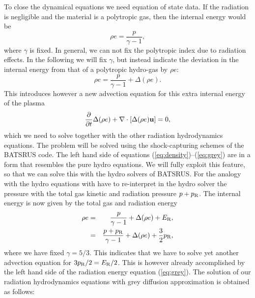 \documentclass[12pt]{article}
\newcommand{\Erad}{E_{\rm R}}
\newcommand{\prad}{p_{\rm R}}
\begin{document}
To close the dynamical equations we need equation of state data. 
If the radiation is negligible and the material is a polytropic gas, 
then the internal energy would be 
\begin{equation} 
\rho e = \frac{p}{\gamma - 1}, 
\end{equation} 
where $\gamma$ is fixed. In general, we can not fix the polytropic index due 
to radiation effects. In the following we will fix $\gamma$, but instead  
indicate the deviation in the internal energy from that of a polytropic 
hydro-gas by $\rho e$: 
\begin{equation} 
\rho e = \frac{p}{\gamma - 1} + \Delta (\rho e). 
\end{equation} 
This introduces however a new advection equation for this extra internal 
energy of the plasma 
\begin{equation} 
\frac{\partial}{\partial t} \Delta(\rho e) + \nabla\cdot\left[  
\Delta(\rho e) {\bf u} \right] = 0, 
\end{equation} 
which we need to solve together with the other radiation hydrodynamics 
equations.  The problem will be solved using the shock-capturing schemes of 
the BATSRUS code. The left hand side of equations 
(\ref{eq:density})--(\ref{eq:grey}) are in a form that resembles the pure 
hydro equations. We will fully exploit this feature, so that we can solve 
this with the hydro solvers of BATSRUS. For the analogy with the hydro 
equations with have to re-interpret in the hydro solver the pressure with 
the total gas kinetic and radiation pressure $p+\prad$. The internal 
energy is now given by the total gas and radiation energy 
\begin{eqnarray} \rho e &=& \frac{p}{\gamma - 1} + \Delta (\rho e) + 
\Erad, \nonumber \\        
&=& \frac{p+\prad}{\gamma - 1} + \Delta (\rho e) + \frac{3}{2}\prad, 
\end{eqnarray} 
where we have fixed $\gamma=5/3$. This indicates that we have to solve yet 
another advection equation for $3\prad/2=\Erad/2$. This is however 
already accomplished by the left hand side of the radiation energy equation 
(\ref{eq:grey}).  The solution of our radiation hydrodynamics equations with 
grey diffusion approximation is obtained as follows: 
\end{document}
